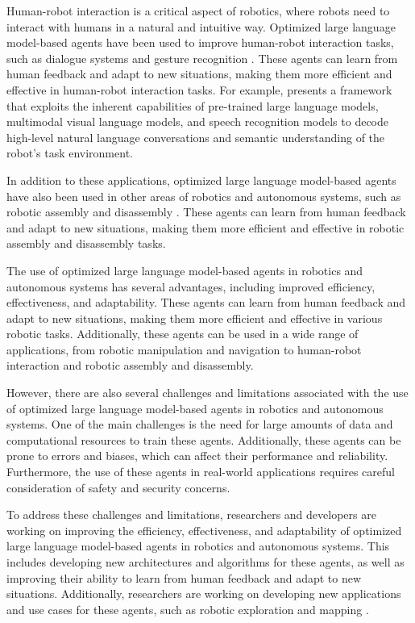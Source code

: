 \documentclass[11pt]{article}
\begin{document}
Human-robot interaction is a critical aspect of robotics, where robots need to interact with humans in a natural and intuitive way. Optimized large language model-based agents have been used to improve human-robot interaction tasks, such as dialogue systems and gesture recognition \cite{ref240}. These agents can learn from human feedback and adapt to new situations, making them more efficient and effective in human-robot interaction tasks. For example, \cite{ref241} presents a framework that exploits the inherent capabilities of pre-trained large language models, multimodal visual language models, and speech recognition models to decode high-level natural language conversations and semantic understanding of the robot's task environment.

In addition to these applications, optimized large language model-based agents have also been used in other areas of robotics and autonomous systems, such as robotic assembly and disassembly \cite{ref242}. These agents can learn from human feedback and adapt to new situations, making them more efficient and effective in robotic assembly and disassembly tasks.

The use of optimized large language model-based agents in robotics and autonomous systems has several advantages, including improved efficiency, effectiveness, and adaptability. These agents can learn from human feedback and adapt to new situations, making them more efficient and effective in various robotic tasks. Additionally, these agents can be used in a wide range of applications, from robotic manipulation and navigation to human-robot interaction and robotic assembly and disassembly.

However, there are also several challenges and limitations associated with the use of optimized large language model-based agents in robotics and autonomous systems. One of the main challenges is the need for large amounts of data and computational resources to train these agents. Additionally, these agents can be prone to errors and biases, which can affect their performance and reliability. Furthermore, the use of these agents in real-world applications requires careful consideration of safety and security concerns.

To address these challenges and limitations, researchers and developers are working on improving the efficiency, effectiveness, and adaptability of optimized large language model-based agents in robotics and autonomous systems. This includes developing new architectures and algorithms for these agents, as well as improving their ability to learn from human feedback and adapt to new situations. Additionally, researchers are working on developing new applications and use cases for these agents, such as robotic exploration and mapping \cite{ref243}.
\end{document}
